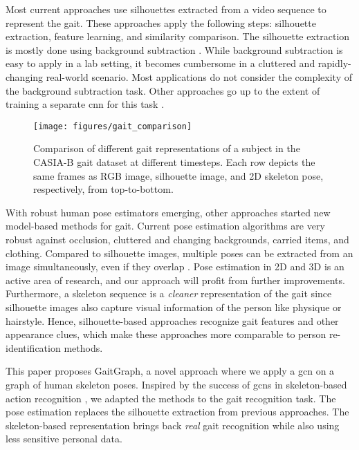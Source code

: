 \documentclass{article}
\begin{document}
Most current approaches \cite{song2019gaitnet, chao2019gaitset, fan2020gaitpart} use silhouettes extracted from a video sequence to represent the gait. These approaches apply the following steps: silhouette extraction, feature learning, and similarity comparison. The silhouette extraction is mostly done using background subtraction \cite{wang2003silhouette}. While background subtraction is easy to apply in a lab setting, it becomes cumbersome in a cluttered and rapidly-changing real-world scenario. Most applications \cite{chao2019gaitset, fan2020gaitpart, wu2016comprehensive} do not consider the complexity of the background subtraction task. Other approaches go up to the extent of training a separate \gls{cnn} for this task \cite{song2019gaitnet}.

\begin{figure}[t!]
  \begin{center}
\texttt{[image: figures/gait\_comparison]}
  \end{center}
  \caption{Comparison of different gait representations of a subject in the \mbox{CASIA-B} gait dataset at different timesteps. Each row depicts the same frames as RGB image, silhouette image, and 2D skeleton pose, respectively, from top-to-bottom.}
  \label{fig:gaitseq}
\end{figure}

With robust human pose estimators emerging, other approaches \cite{liao2017pose, liao2020model} started new model-based methods for gait. Current pose estimation algorithms are very robust against occlusion, cluttered and changing backgrounds, carried items, and clothing. Compared to silhouette images, multiple poses can be extracted from an image simultaneously, even if they overlap \cite{cheng2020bottom}. Pose estimation in 2D and 3D is an active area of research, and our approach will profit from further improvements.
Furthermore, a skeleton sequence is a \textit{cleaner} representation of the gait since silhouette images also capture visual information of the person like physique or hairstyle. Hence, silhouette-based approaches recognize gait features and other appearance clues, which make these approaches more comparable to person re-identification methods.


This paper proposes GaitGraph, a novel approach where we apply a \gls{gcn} on a graph of human skeleton poses.
Inspired by the success of \glspl{gcn} in skeleton-based action recognition \cite{yan2018spatial, song2020stronger}, we adapted the methods to the gait recognition task.
The pose estimation replaces the silhouette extraction from previous approaches. 
The skeleton-based representation brings back \textit{real} gait recognition while also using less sensitive personal data. 
\end{document}
